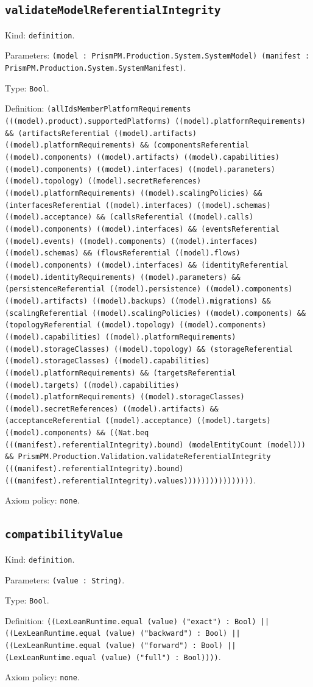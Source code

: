 \documentclass[11pt]{article}
\begin{document}
\subsection*{\texttt{validateModelReferentialIntegrity}}
\noindent Kind: \texttt{definition}.\par
\noindent Parameters: \texttt{(model : PrismPM.Production.System.SystemModel) (manifest : PrismPM.Production.System.SystemManifest)}.\par
\noindent Type: \texttt{Bool}.\par
\noindent Definition: \texttt{(allIdsMemberPlatformRequirements (((model).product).supportedPlatforms) ((model).platformRequirements) \&\& (artifactsReferential ((model).artifacts) ((model).platformRequirements) \&\& (componentsReferential ((model).components) ((model).artifacts) ((model).capabilities) ((model).components) ((model).interfaces) ((model).parameters) ((model).topology) ((model).secretReferences) ((model).platformRequirements) ((model).scalingPolicies) \&\& (interfacesReferential ((model).interfaces) ((model).schemas) ((model).acceptance) \&\& (callsReferential ((model).calls) ((model).components) ((model).interfaces) \&\& (eventsReferential ((model).events) ((model).components) ((model).interfaces) ((model).schemas) \&\& (flowsReferential ((model).flows) ((model).components) ((model).interfaces) \&\& (identityReferential ((model).identityRequirements) ((model).parameters) \&\& (persistenceReferential ((model).persistence) ((model).components) ((model).artifacts) ((model).backups) ((model).migrations) \&\& (scalingReferential ((model).scalingPolicies) ((model).components) \&\& (topologyReferential ((model).topology) ((model).components) ((model).capabilities) ((model).platformRequirements) ((model).storageClasses) ((model).topology) \&\& (storageReferential ((model).storageClasses) ((model).capabilities) ((model).platformRequirements) \&\& (targetsReferential ((model).targets) ((model).capabilities) ((model).platformRequirements) ((model).storageClasses) ((model).secretReferences) ((model).artifacts) \&\& (acceptanceReferential ((model).acceptance) ((model).targets) ((model).components) \&\& ((Nat.beq (((manifest).referentialIntegrity).bound) (modelEntityCount (model))) \&\& PrismPM.Production.Validation.validateReferentialIntegrity (((manifest).referentialIntegrity).bound) (((manifest).referentialIntegrity).values))))))))))))))))}.\par
\noindent Axiom policy: \texttt{none}.\par
\subsection*{\texttt{compatibilityValue}}
\noindent Kind: \texttt{definition}.\par
\noindent Parameters: \texttt{(value : String)}.\par
\noindent Type: \texttt{Bool}.\par
\noindent Definition: \texttt{((LexLeanRuntime.equal (value) ("exact") : Bool) || ((LexLeanRuntime.equal (value) ("backward") : Bool) || ((LexLeanRuntime.equal (value) ("forward") : Bool) || (LexLeanRuntime.equal (value) ("full") : Bool))))}.\par
\noindent Axiom policy: \texttt{none}.\par
\end{document}
